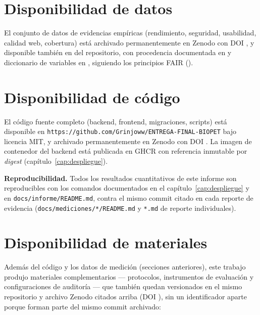 \section{Disponibilidad de datos}

El conjunto de datos de evidencias emp\'iricas (rendimiento, seguridad,
usabilidad, calidad web, cobertura) est\'a archivado permanentemente en
Zenodo con DOI \texttt{\doidataset}, y disponible tambi\'en en
 del repositorio, con procedencia documentada en
 y diccionario de variables en
, siguiendo los principios
FAIR ().

\section{Disponibilidad de c\'odigo}

El c\'odigo fuente completo (backend, frontend, migraciones, scripts) est\'a
disponible en \texttt{https://github.com/Grinjoww/ENTREGA-FINAL-BIOPET}
bajo licencia MIT, y archivado permanentemente en Zenodo con DOI
\texttt{\doisoftware}. La imagen de contenedor del backend est\'a publicada
en GHCR con referencia inmutable por \emph{digest}
(cap\'itulo~\ref{cap:despliegue}).

\textbf{Reproducibilidad.} Todos los resultados cuantitativos de este
informe son reproducibles con los comandos documentados en el
cap\'itulo~\ref{cap:despliegue} y en \texttt{docs/informe/README.md},
contra el mismo commit citado en cada reporte de evidencia
(\texttt{docs/mediciones/*/README.md} y \texttt{*.md} de reporte
individuales).

\section{Disponibilidad de materiales}

Adem\'as del c\'odigo y los datos de medici\'on (secciones anteriores),
este trabajo produjo materiales complementarios --- protocolos,
instrumentos de evaluaci\'on y configuraciones de auditor\'ia --- que
tambi\'en quedan versionados en el mismo repositorio y archivo Zenodo
citados arriba (DOI \texttt{\doisoftware}), sin un identificador aparte
porque forman parte del mismo commit archivado:

